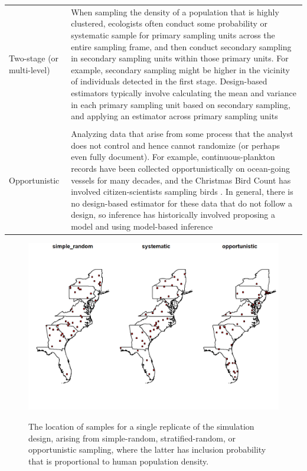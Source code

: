 \begin{table}
\begin{center}
\begin{tabularx}{\textwidth}{ | X m{4.25in} | }
  Two-stage (or multi-level) & When sampling the density of a population that is highly clustered, ecologists often conduct some probability or systematic sample for primary sampling units across the entire sampling frame, and then conduct secondary sampling in secondary sampling units within those primary units.  For example, secondary sampling might be higher in the vicinity of individuals detected in the first stage.  Design-based estimators typically involve calculating the mean and variance in each primary sampling unit based on secondary sampling, and applying an estimator across primary sampling units \\ & \\

  Opportunistic & Analyzing data that arise from some process that the analyst does not control and hence cannot randomize (or perhaps even fully document).  For example, continuous-plankton records \cite{colebrook_continuous_1978} have been collected opportunistically on ocean-going vessels for many decades, and the Christmas Bird Count has involved citizen-scientists sampling birds \cite{bock_christmas_1981}. In general, there is no design-based estimator for these data that do not follow a design, so inference has historically involved proposing a model and using model-based inference \cite{butcher_evaluation_1990} \\
  
  \hline
\end{tabularx}
  \label{tab:Chap6_sampling_designs}
\end{center}
\end{table}

\begin{figure}[!ht]
    \caption[Sampling locations in simulated sampling designs]{The location of samples for a single replicate of the simulation design, arising from simple-random, stratified-random, or opportunistic sampling, where the latter has inclusion probability that is proportional to human population density.}
    \centering
    \includegraphics[width=5.5in]{Chap_6/Design.png}
    \label{fig:Chap6_design}
\end{figure}

